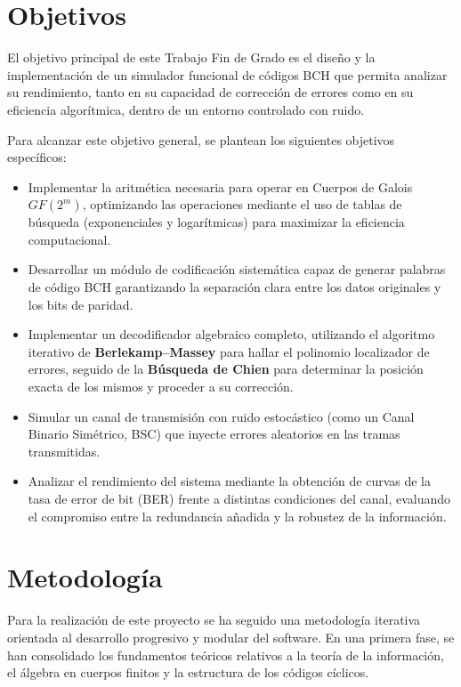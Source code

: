 \section{Objetivos}

El objetivo principal de este Trabajo Fin de Grado es el diseño y la implementación de un simulador funcional de códigos BCH que permita analizar su rendimiento, tanto en su capacidad de corrección de errores como en su eficiencia algorítmica, dentro de un entorno controlado con ruido.

Para alcanzar este objetivo general, se plantean los siguientes objetivos específicos:

\begin{itemize}
    \item Implementar la aritmética necesaria para operar en Cuerpos de Galois $GF(2^m)$, optimizando las operaciones mediante el uso de tablas de búsqueda (exponenciales y logarítmicas) para maximizar la eficiencia computacional.
    \item Desarrollar un módulo de codificación sistemática capaz de generar palabras de código BCH garantizando la separación clara entre los datos originales y los bits de paridad.
    \item Implementar un decodificador algebraico completo, utilizando el algoritmo iterativo de \textbf{Berlekamp–Massey} para hallar el polinomio localizador de errores, seguido de la \textbf{Búsqueda de Chien} para determinar la posición exacta de los mismos y proceder a su corrección.
    \item Simular un canal de transmisión con ruido estocástico (como un Canal Binario Simétrico, BSC) que inyecte errores aleatorios en las tramas transmitidas.
    \item Analizar el rendimiento del sistema mediante la obtención de curvas de la tasa de error de bit (BER) frente a distintas condiciones del canal, evaluando el compromiso entre la redundancia añadida y la robustez de la información.
\end{itemize}

\section{Metodología}

Para la realización de este proyecto se ha seguido una metodología iterativa orientada al desarrollo progresivo y modular del software. En una primera fase, se han consolidado los fundamentos teóricos relativos a la teoría de la información, el álgebra en cuerpos finitos y la estructura de los códigos cíclicos.

